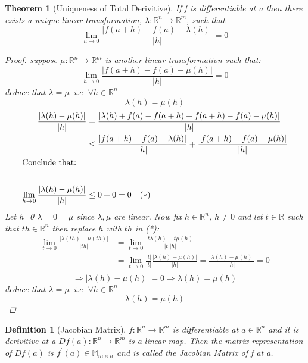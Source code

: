 \documentclass[11pt]{article}
\def\MM{\mathbb{M}}
\def\RR{\mathbb{R}}
\newtheorem{theorem}{Theorem}[section]
\newtheorem{definition}{Definition}[section]
\begin{document}
\begin{theorem}[Uniqueness of Total Derivitive]\label{T:Uniqueness of Total Derivitive}
If f is differentiable at a then there exists a unique linear transformation, $ \lambda:\RR^{n} \rightarrow \RR^{m}$, such that
\[\lim_{h \to 0}\frac{|f(a+h) - f(a) - \lambda(h)|}{|h|} =0 \]
\begin{proof}
suppose $ \mu:\RR^{n} \rightarrow \RR^{m}$ is another linear transformation such that:
\[\lim_{h \to 0}\frac{|f(a+h) - f(a) - \mu(h)|}{|h|} =0 \]
deduce that $\lambda= \mu \;\;  i.e \; \;\forall h\in\RR^{n}$
 \[ \lambda(h)= \mu(h)\]
\begin{align*}
\frac{|\lambda(h)- \mu(h)|}{|h|}&= \frac{|\lambda(h) +f(a) -f(a+h) +f(a+h) -f(a)- \mu(h)|}{|h|}\\
&\leq \frac{|f(a+h) -f(a) -\lambda(h)|}{|h|} +  \frac{|f(a+h) -f(a) -\mu(h)|}{|h|}\\
\shortintertext{Conclude that:} \qquad \qquad \qquad &\\
\lim_{h \to 0}\frac{|\lambda(h)- \mu(h)|}{|h|} &\leq 0 + 0 =0 \quad (*)
\end{align*}
Let h=0 $\lambda= 0=\mu$ since $\lambda, \mu$ are linear. Now fix $h \in \RR^{n}$, $h\neq0$ and let $t\in\RR$ such that $th\in\RR^{n} $ then replace $h$ with $th$ in (*):
\begin{align*}
\lim_{t \to 0}\frac{|\lambda(th)- \mu(th)|}{|th|}&= \lim_{t \to 0}\frac{|t\lambda(h)- t\mu(h)|}{|t||h|}\\
&= \lim_{t \to 0}\frac{|t|}{|t|}\frac{|\lambda(h)- \mu(h)|}{|h|}= \frac{|\lambda(h)- \mu(h)|}{|h|} = 0\\
\end{align*}
\[\Rightarrow |\lambda(h)- \mu(h)|=0 \Rightarrow \lambda(h)= \mu(h)\]
deduce that $\lambda= \mu \;\;  i.e \; \;\forall h\in\RR^{n}$
 \[ \lambda(h)= \mu(h)\]

\end{proof}
\end{theorem}

\begin{definition}[Jacobian Matrix]\label{D:Jacobian Matrix}
$f:\RR^{n} \rightarrow \RR^{m}$ is differentiable at $a \in \RR^{n}$ and it is derivitive at a $Df(a):\RR^{n} \rightarrow \RR^{m}$ is a linear map. Then the matrix representation of $Df(a)$ is $f^{'}(a) \in \MM_{m\times n}$ and is called the Jacobian Matrix of f at a.
\end{definition}
\end{document}

